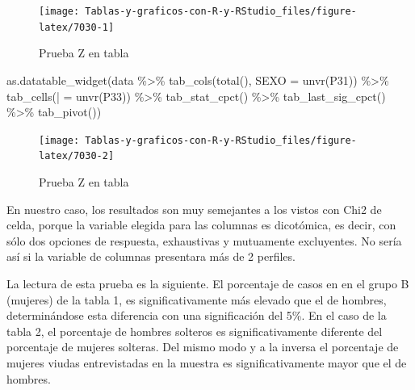 \documentclass[
]{book}
\newenvironment{Shaded}{\begin{snugshade}}{\end{snugshade}}
\newcommand{\AttributeTok}[1]{\textcolor[rgb]{0.77,0.63,0.00}{#1}}
\newcommand{\FunctionTok}[1]{\textcolor[rgb]{0.00,0.00,0.00}{#1}}
\newcommand{\NormalTok}[1]{#1}
\newcommand{\OtherTok}[1]{\textcolor[rgb]{0.56,0.35,0.01}{#1}}
\newcommand{\SpecialCharTok}[1]{\textcolor[rgb]{0.00,0.00,0.00}{#1}}
\newcommand{\StringTok}[1]{\textcolor[rgb]{0.31,0.60,0.02}{#1}}
\begin{document}
\begin{figure}[H]

{\centering \texttt{[image: Tablas-y-graficos-con-R-y-RStudio\_files/figure-latex/7030-1]} 

}

\caption{Prueba Z en tabla}\label{fig:7030}
\end{figure}

\begin{Shaded}
\begin{Highlighting}[]
\FunctionTok{as.datatable\_widget}\NormalTok{(data }\SpecialCharTok{\%\textgreater{}\%}
  \FunctionTok{tab\_cols}\NormalTok{(}\FunctionTok{total}\NormalTok{(), }\AttributeTok{SEXO =} \FunctionTok{unvr}\NormalTok{(P31)) }\SpecialCharTok{\%\textgreater{}\%}
  \FunctionTok{tab\_cells}\NormalTok{(}\StringTok{\textasciigrave{}}\AttributeTok{|}\StringTok{\textasciigrave{}} \OtherTok{=} \FunctionTok{unvr}\NormalTok{(P33)) }\SpecialCharTok{\%\textgreater{}\%}
  \FunctionTok{tab\_stat\_cpct}\NormalTok{() }\SpecialCharTok{\%\textgreater{}\%}
  \FunctionTok{tab\_last\_sig\_cpct}\NormalTok{() }\SpecialCharTok{\%\textgreater{}\%}
  \FunctionTok{tab\_pivot}\NormalTok{())}
\end{Highlighting}
\end{Shaded}

\begin{figure}[H]

{\centering \texttt{[image: Tablas-y-graficos-con-R-y-RStudio\_files/figure-latex/7030-2]} 

}

\caption{Prueba Z en tabla}\label{fig:7030}
\end{figure}

En nuestro caso, los resultados son muy semejantes a los vistos con Chi2 de celda, porque la variable elegida para las columnas es dicotómica, es decir, con sólo dos opciones de respuesta, exhaustivas y mutuamente excluyentes. No sería así si la variable de columnas presentara más de 2 perfiles.

La lectura de esta prueba es la siguiente. El porcentaje de casos en en el grupo B (mujeres) de la tabla 1, es significativamente más elevado que el de hombres, determinándose esta diferencia con una significación del 5\%. En el caso de la tabla 2, el porcentaje de hombres solteros es significativamente diferente del porcentaje de mujeres solteras. Del mismo modo y a la inversa el porcentaje de mujeres viudas entrevistadas en la muestra es significativamente mayor que el de hombres.
\end{document}
